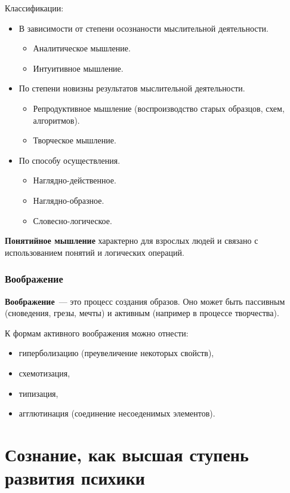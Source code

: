 Классификации:
\begin{itemize}
	\item В зависимости от степени осознаности мыслительной деятельности.
		\begin{itemize}
			\item Аналитическое мышление.
			\item Интуитивное мышление.
		\end{itemize}
	\item По степени новизны результатов мыслительной деятельности.
		\begin{itemize}
			\item Репродуктивное мышление (воспроизводство старых образцов, схем, алгоритмов).
			\item Творческое мышление.
		\end{itemize}
	\item По способу осуществления.
		\begin{itemize}
			\item Наглядно-действенное.
			\item Наглядно-образное.
			\item Словесно-логическое.
		\end{itemize}
\end{itemize}

\textbf{Понятийное мышление} характерно для взрослых людей и связано с использованием понятий и логических операций.

\subsubsection{Воображение}
\textbf{Воображение}~--- это процесс создания образов. Оно может быть пассивным (сноведения, грезы, мечты) и активным (например в процессе творчества). 

К формам активного воображения можно отнести:
\begin{itemize}
	\item гиперболизацию (преувеличение некоторых свойств),
	\item схемотизация,
	\item типизация,
	\item агглютинация (соединение несоеденимых элементов).
\end{itemize}

\section{Сознание, как высшая ступень развития психики}
